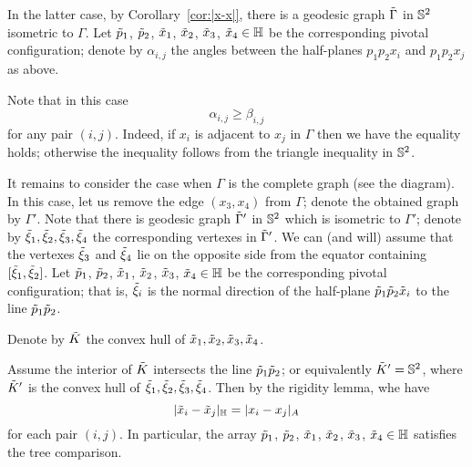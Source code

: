 In the latter case, by Corollary~\ref{cor:|x-x|}, there is a geodesic graph $\~\Gamma$ in $\SS^2$ isometric to $\Gamma$.
Let $\~p_1$, $\~p_2$, $\~x_1$, $\~x_2$, $\~x_3$, $\~x_4\in \HH$ be the corresponding pivotal configuration;
denote by $\alpha_{i,j}$ the angles between the half-planes $p_1p_2x_i$ and $p_1p_2x_j$ as above.

Note that in this case
\[\alpha_{i,j}\ge \beta_{i,j}\]
for any pair $(i,j)$.
Indeed, if $x_i$ is adjacent to $x_j$ in $\Gamma$ then we have the equality holds;
otherwise the inequality follows from the triangle inequality in $\SS^2$.

\begin{comment}
\begin{wrapfigure}{r}{14 mm}
\begin{tikzpicture}[scale=1,
  thick,main node/.style={circle,draw,font=\sffamily\bfseries,minimum size=3mm}]

  \node[main node] (1) at (0,0) {};
  \node[main node] (2) at (0,1){};
  \node[main node] (3) at (1,1){};
  \node[main node] (4) at (1,0) {};

  \path[every node/.style={font=\sffamily\small}]
   (1) edge node[above]{}(2)
   (2) edge node[above]{}(3)
   (2) edge node[above]{}(4)
   (3) edge node[above]{}(1)
   (3) edge node[above]{}(4)
   (1) edge node[above]{}(4);
\end{tikzpicture}
\end{wrapfigure}
\end{comment}

It remains to consider the case when $\Gamma$ is the complete graph (see the diagram). 
In this case, let us remove the edge $(x_3,x_4)$ from $\Gamma$;
denote the obtained graph by $\Gamma'$.
Note that there is geodesic graph $\~\Gamma'$ in $\SS^2$ which is isometric to $\Gamma'$;
denote by $\~\xi_1,\~\xi_2,\~\xi_3,\~\xi_4$ the corresponding vertexes in $\~\Gamma'$.
We can (and will) assume that the vertexes $\~\xi_3$ and $\~\xi_4$ lie on the opposite side from the equator containing $[\~\xi_1,\~\xi_2]$.
Let $\~p_1$, $\~p_2$, $\~x_1$, $\~x_2$, $\~x_3$, $\~x_4\in \HH$ be the corresponding pivotal configuration;
that is, $\~\xi_i$ is the normal direction of the half-plane $\~p_1\~p_2\~x_i$ to the line $\~p_1\~p_2$.


Denote by $\~K$ the convex hull of $\~x_1,\~x_2,\~x_3,\~x_4$.

Assume the interior of $\~K$ intersects the line $\~p_1\~p_2$;
or equivalently $\~K'=\SS^2$, where $\~K'$ is the convex hull  of $\~\xi_1,\~\xi_2,\~\xi_3,\~\xi_4$.
Then by the rigidity lemma, whe have 
\[|\~x_i-\~x_j|_\HH=|x_i-x_j|_A\]
for each pair $(i,j)$.
In particular, the array $\~p_1$, $\~p_2$, $\~x_1$, $\~x_2$, $\~x_3$, $\~x_4\in \HH$ satisfies the tree comparison.

